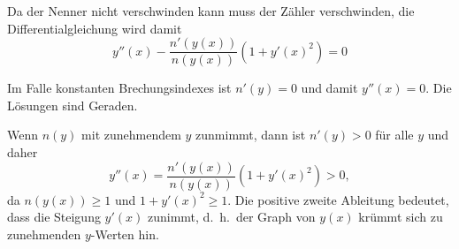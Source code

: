 \begin{loesung}
\begin{teilaufgaben}
Da der Nenner nicht verschwinden kann muss der Zähler verschwinden,
die Differentialgleichung wird damit
\[
y''(x)
-
\frac{n'(y(x))}{n(y(x))} (1 + y'(x)^2)
=
0
\]
\item
Im Falle konstanten Brechungsindexes ist $n'(y)=0$ und damit $y''(x)=0$.
Die Lösungen sind Geraden.
\item
Wenn $n(y)$ mit zunehmendem $y$ zunmimmt, dann ist $n'(y)>0$ für alle $y$
und daher
\[
y''(x)
=
\frac{n'(y(x))}{n(y(x))} (1 + y'(x)^2)
>
0,
\]
da $n(y(x))\ge 1$ und $1+y'(x)^2\ge 1$.
Die positive zweite Ableitung bedeutet, dass die Steigung $y'(x)$ zunimmt,
d.~h.~der Graph von $y(x)$ krümmt sich zu zunehmenden $y$-Werten hin.
\qedhere
\end{teilaufgaben}
\end{loesung}


